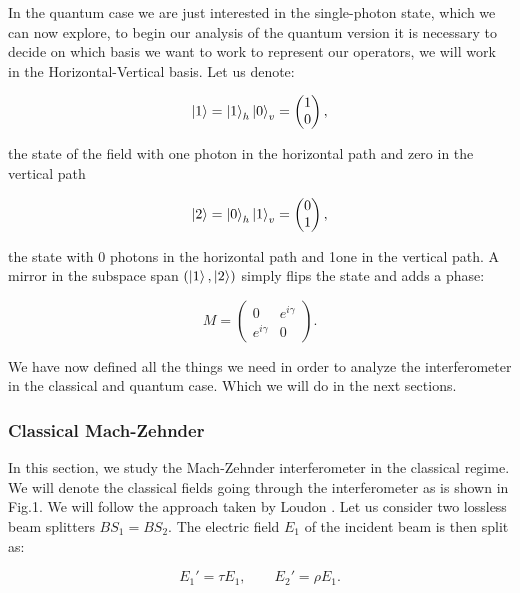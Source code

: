 \documentclass[12pt]{book}
\begin{document}
In the quantum case we are just interested in the single-photon state, which we can now explore, to begin our analysis of the quantum version it is necessary to decide on which basis we want to work to represent our operators, we will work in the Horizontal-Vertical basis. Let us denote:

 \begin{equation}
 \ket{1}=\ket{1}_{h}\ket{0}_{v}=\begin{pmatrix} 1 \\0\end{pmatrix},
 \end{equation} 

the state of the field with one photon in the horizontal path and zero in the vertical path

 \begin{equation}
 \ket{2}=\ket{0}_{h}\ket{1}_{v}=\begin{pmatrix} 0 \\1 \end{pmatrix},
 \end{equation}
 
the state with 0 photons in the horizontal path and 1one in the vertical path. A mirror in the subspace span $(\ket{1},\ket{2})$ simply flips the state and adds a phase: 
 
\begin{equation}
M=\begin{pmatrix} 0& e^{i\gamma}  \\ e^{i\gamma} & 0 \end{pmatrix}.
\end{equation}

We have now defined all the things we need in order to analyze the interferometer in the classical and quantum case. Which we will do in the next sections.



\subsubsection{Classical Mach-Zehnder}

In this section, we study the Mach-Zehnder interferometer in the classical regime. We will denote the classical fields going through the interferometer as is shown in Fig.1. We will follow the approach taken by Loudon \cite{loudon}. Let us consider two lossless beam splitters   $BS_{1}=BS_{2}$. The electric field $E_{1}$ of the incident beam is then split as:

\begin{equation}
E_{1}'=\tau E_{1} ,\qquad E_{2}'=\rho E_{1}.
\end{equation}
\end{document}
